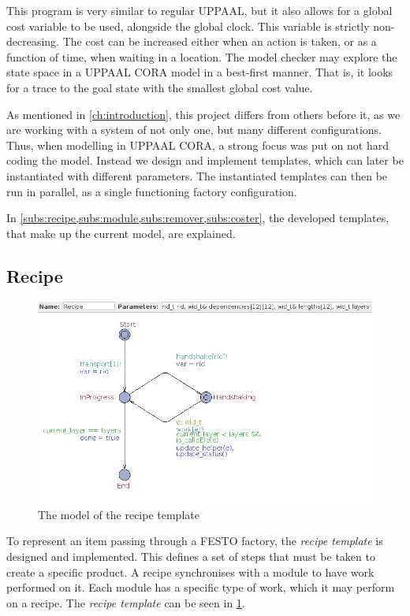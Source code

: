 This program is very similar to regular UPPAAL, but it also allows for a global cost variable to be used, alongside the global clock. This variable is strictly non-decreasing. The cost can be increased either when an action is taken, or as a function of time, when waiting in a location. The model checker may explore the state space in a UPPAAL CORA model in a best-first manner. That is, it looks for a trace to the goal state with the smallest global cost value.

As mentioned in \cref{ch:introduction}, this project differs from others before it, as we are working with a system of not only one, but many different configurations. Thus, when modelling in UPPAAL CORA, a strong focus was put on not hard coding the model. Instead we design and implement templates, which can later be instantiated with different parameters. The instantiated templates can then be run in parallel, as a single functioning factory configuration.

In \cref{subs:recipe,subs:module,subs:remover,subs:coster}, the developed templates, that make up the current model, are explained.

\subsection{Recipe}
\label{subs:recipe}

\begin{figure}[h]
\centering
\includegraphics[width=\textwidth]{images/firstrecipe.png}
\caption{The model of the recipe template}
\label{fig:firstrecipe}
\end{figure}

To represent an item passing through a FESTO factory, the \emph{recipe template} is designed and implemented. This defines a set of steps that must be taken to create a specific product. A recipe synchronises with a module to have work performed on it. Each module has a specific type of work, which it may perform on a recipe. The \emph{recipe template} can be seen in \cref{fig:firstrecipe}.



